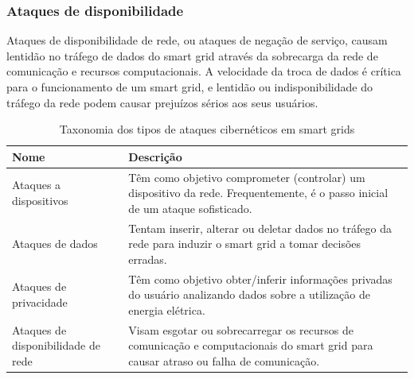 \documentclass[cic,tc]{iiufrgs}
\begin{document}
\subsubsection{Ataques de disponibilidade}
Ataques de disponibilidade de rede, ou ataques de negação de serviço, causam lentidão no tráfego de dados do smart grid através da sobrecarga da rede de comunicação e recursos computacionais. A velocidade da troca de dados é crítica para o funcionamento de um smart grid, e lentidão ou indisponibilidade do tráfego da rede podem causar prejuízos sérios aos seus usuários.

\begin{table}[h]
   \caption{Taxonomia dos tipos de ataques cibernéticos em smart grids}
   \centering
       \begin{tabular}{p{4cm}|p{8cm}}
         \hline
         Nome  &  Descrição\\
         \hline
         \hline
         Ataques a dispositivos & Têm como objetivo comprometer (controlar) um dispositivo da rede. Frequentemente, é o passo inicial de um ataque sofisticado.\\
         \hline
		Ataques de dados & Tentam inserir, alterar ou deletar dados no tráfego da rede para induzir o smart grid a tomar decisões erradas.\\
 \hline
		Ataques de privacidade & Têm como objetivo obter/inferir informações privadas do usuário analizando dados sobre a utilização de energia elétrica.\\
 \hline
		Ataques de disponibilidade de rede & Visam esgotar ou sobrecarregar os recursos de comunicação e computacionais do smart grid para causar atraso ou falha de comunicação. \\
         \hline
       \end{tabular}
\label{tbl:attacktypes}
\end{table}
\end{document}
